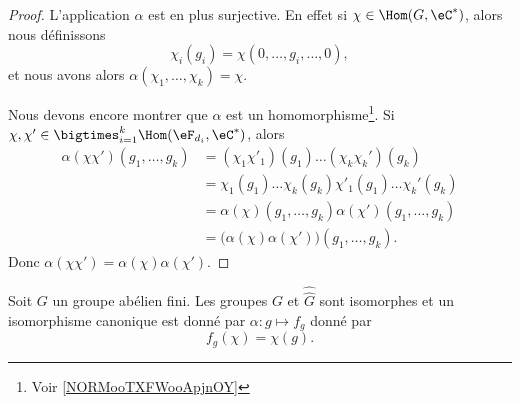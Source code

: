 \begin{proof}
	L'application \( \alpha\) est en plus surjective. En effet si \( \chi\in\Hom(G,\eC^*)\), alors nous définissons
	\begin{equation}
		\chi_i(g_i)=\chi(0,\ldots, g_i,\ldots, 0),
	\end{equation}
	et nous avons alors \( \alpha(\chi_1,\ldots, \chi_k)=\chi\).

	Nous devons encore montrer que \( \alpha\) est un homomorphisme\footnote{Voir \ref{NORMooTXFWooApjnOY}}. Si \( \chi,\chi'\in\bigtimes_{i=1}^k\Hom(\eF_{d_i},\eC^*)\), alors
	\begin{subequations}
		\begin{align}
			\alpha(\chi\chi')(g_1,\ldots, g_k) & =(\chi_1\chi'_1)(g_1)\ldots (\chi_k\chi_k')(g_k)              \\
			                                   & =\chi_1(g_1)\ldots \chi_k(g_k)\chi'_1(g_1)\ldots \chi_k'(g_k) \\
			                                   & =\alpha(\chi)(g_1,\ldots, g_k)\alpha(\chi')(g_1,\ldots, g_k)  \\
			                                   & =\big( \alpha(\chi)\alpha(\chi') \big)(g_1,\ldots, g_k).
		\end{align}
	\end{subequations}
	Donc \( \alpha(\chi\chi')=\alpha(\chi)\alpha(\chi')\).
\end{proof}

\begin{theorem}		\label{THOooLZAHooMerBZs}
	Soit \( G\) un groupe abélien fini. Les groupes \( G\) et \( \hat{\hat G}\) sont isomorphes et un isomorphisme canonique est donné par \( \alpha\colon g\mapsto f_g\) donné par
	\begin{equation}
		f_g(\chi)=\chi(g).
	\end{equation}
\end{theorem}

